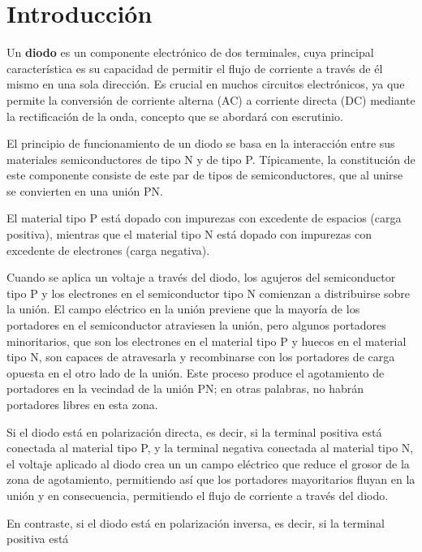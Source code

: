 \documentclass[12pt]{article}
\begin{document}
    \section*{Introducción}
    \label{sec:introduccion}
        \noindent Un \textbf{diodo} es un componente electrónico de dos terminales, cuya principal característica es
        su capacidad de permitir el flujo de corriente a través de él mismo en una sola dirección.
        Es crucial en muchos circuitos electrónicos, ya que permite la conversión de corriente alterna
        (AC) a corriente directa (DC) mediante la rectificación de la onda, concepto que se abordará
        con escrutinio. \par
        El principio de funcionamiento de un diodo se basa en la interacción entre sus materiales
        semiconductores de tipo N y de tipo P. Típicamente, la constitución de este componente 
        consiste de este par de tipos de semiconductores, que al unirse se convierten en una unión PN. \par
        El material tipo P está dopado con impurezas con excedente de espacios (carga positiva),
        mientras que el material tipo N está dopado con impurezas con excedente de electrones (carga negativa).\par
        Cuando se aplica un voltaje a través del diodo, los agujeros del semiconductor tipo P y 
        los electrones en el semiconductor tipo N comienzan a distribuirse sobre la unión.
        El campo eléctrico en la unión previene que la mayoría de los portadores en el semiconductor
        atraviesen la unión, pero algunos portadores minoritarios, que son los electrones en el material
        tipo P y huecos en el material tipo N, son capaces de atravesarla y recombinarse con los 
        portadores de carga opuesta en el otro lado de la unión. Este proceso produce el agotamiento de 
        portadores en la vecindad de la unión PN; en otras palabras, no habrán portadores libres en esta zona.\par
        Si el diodo está en polarización directa, es decir, si la terminal positiva está conectada al
        material tipo P, y la terminal negativa conectada al material tipo N, el voltaje aplicado al
        diodo crea un un campo eléctrico que reduce el grosor de la zona de agotamiento, permitiendo
        así que los portadores mayoritarios fluyan en la unión y en consecuencia, permitiendo el flujo 
        de corriente a través del diodo.\par
        En contraste, si el diodo está en polarización inversa, es decir, si la terminal positiva está
\end{document}
